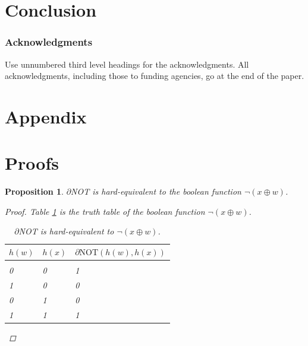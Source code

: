\documentclass{article} %
\newtheorem{prop}{Proposition}
\begin{document}
\section{Conclusion}


\subsubsection*{Acknowledgments}
Use unnumbered third level headings for the acknowledgments. All
acknowledgments, including those to funding agencies, go at the end of the paper.





\appendix

\section*{Appendix}

\section{Proofs}

\begin{prop}\label{prop:not}
	$\partial${NOT} is hard-equivalent to the boolean function
	$\neg (x \oplus w)$.
\begin{proof}
	Table \ref{not-table} is the truth table of the boolean function $\neg (x \oplus w)$.
	\begin{table}
		\begin{center}
			\begin{tabular}{lll}
				\multicolumn{1}{c}{$h(w)$}  &\multicolumn{1}{c}{$h(x)$} &\multicolumn{1}{c}{$\partial\text{NOT}(h(w), h(x))$}
				\\ \hline \\
				0 & 0 & 1\\
				1 & 0 & 0\\
				0 & 1 & 0\\
				1 & 1 & 1\\
			\end{tabular}
		\end{center}
		\caption{$\partial${NOT} is hard-equivalent to $\neg (x \oplus w)$.}\label{not-table}
		
	\end{table}
\end{proof}
\end{prop}
\end{document}
